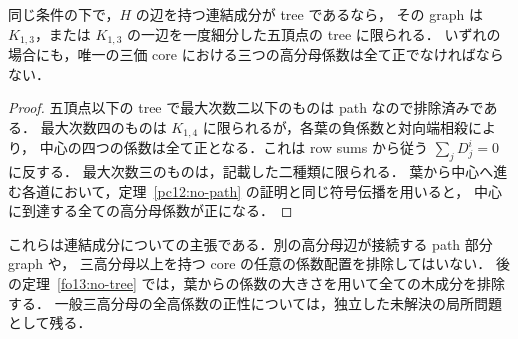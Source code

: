 \begin{proposition}[木成分の中心への予備的な還元]\label{pc12:tree-reduction}
同じ条件の下で，$H$ の辺を持つ連結成分が tree であるなら，
その graph は $K_{1,3}$，または $K_{1,3}$ の一辺を一度細分した五頂点の tree に限られる．
いずれの場合にも，唯一の三価 core における三つの高分母係数は全て正でなければならない．
\end{proposition}

\begin{proof}
五頂点以下の tree で最大次数二以下のものは path なので排除済みである．
最大次数四のものは $K_{1,4}$ に限られるが，各葉の負係数と対向端相殺により，
中心の四つの係数は全て正となる．これは row sums から従う
$\sum_jD^i_j=0$ に反する．
最大次数三のものは，記載した二種類に限られる．
葉から中心へ進む各道において，定理~\ref{pc12:no-path} の証明と同じ符号伝播を用いると，
中心に到達する全ての高分母係数が正になる．
\end{proof}

これらは連結成分についての主張である．別の高分母辺が接続する path 部分 graph や，
三高分母以上を持つ core の任意の係数配置を排除してはいない．
後の定理~\ref{fo13:no-tree} では，葉からの係数の大きさを用いて全ての木成分を排除する．
一般三高分母の全高係数の正性については，独立した未解決の局所問題として残る．
